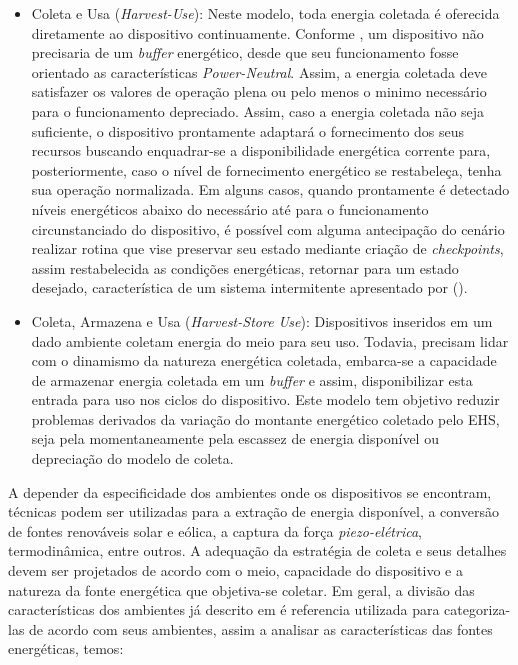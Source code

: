 \begin{itemize}
    \item Coleta e Usa (\textit{Harvest-Use}): Neste modelo, toda energia coletada é oferecida diretamente ao dispositivo continuamente. Conforme \cite{merrett_energy-driven_2017}, um dispositivo não precisaria de um \textit{buffer} energético, desde que seu funcionamento fosse orientado as características \textit{Power-Neutral}. Assim, a energia coletada deve satisfazer os valores de operação plena ou pelo menos o minimo necessário para o funcionamento depreciado. Assim, caso a energia coletada não seja suficiente, o dispositivo prontamente adaptará o fornecimento dos seus recursos buscando enquadrar-se a disponibilidade energética corrente para, posteriormente, caso o nível de fornecimento energético se restabeleça, tenha sua operação normalizada. Em alguns casos, quando prontamente é detectado níveis energéticos abaixo do necessário até para o funcionamento circunstanciado do dispositivo, é possível com alguma antecipação do cenário realizar rotina que vise preservar seu estado mediante criação de \textit{checkpoints}, assim restabelecida as condições energéticas, retornar para um estado desejado, característica de um sistema intermitente apresentado por \citeauthor{sliper_energy-driven_2020} (\citeyear{sliper_energy-driven_2020}).
        
    \item Coleta, Armazena e Usa (\textit{Harvest-Store Use}): Dispositivos inseridos em um dado ambiente coletam energia do meio para seu uso. Todavia, precisam lidar com o dinamismo da natureza energética coletada, embarca-se a capacidade de armazenar energia coletada em um \textit{buffer} e assim, disponibilizar esta entrada para uso nos ciclos do dispositivo. Este modelo tem objetivo reduzir problemas derivados da variação do montante energético coletado pelo \acs{EHS}, seja pela momentaneamente pela escassez de energia disponível ou depreciação do modelo de coleta.
    
\end{itemize}


A depender da especificidade dos ambientes onde os dispositivos se encontram, técnicas podem ser utilizadas para a extração de energia disponível, a conversão de fontes renováveis solar e eólica, a captura da força \textit{piezo-elétrica}, termodinâmica, entre outros. A adequação da estratégia de coleta e seus detalhes devem ser projetados de acordo com o meio, capacidade do dispositivo e a natureza da fonte energética que objetiva-se coletar. Em geral, a divisão das características dos ambientes já descrito em \cite{shaikh_energy_2016} é referencia utilizada para categoriza-las de acordo com seus ambientes, assim a analisar as características das fontes energéticas, temos:

